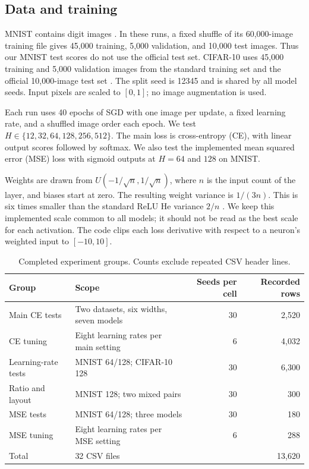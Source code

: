\documentclass[10pt]{article}
\begin{document}
\subsection{Data and training}
MNIST contains digit images \citep{lecun1998}. In these runs, a fixed shuffle of its 60,000-image training file gives 45,000 training, 5,000 validation, and 10,000 test images. Thus our MNIST test scores do not use the official test set. CIFAR-10 uses 45,000 training and 5,000 validation images from the standard training set and the official 10,000-image test set \citep{krizhevsky2009}. The split seed is 12345 and is shared by all model seeds. Input pixels are scaled to $[0,1]$; no image augmentation is used.

Each run uses 40 epochs of SGD with one image per update, a fixed learning rate, and a shuffled image order each epoch. We test $H\in\{12,32,64,128,256,512\}$. The main loss is cross-entropy (CE), with linear output scores followed by softmax. We also test the implemented mean squared error (MSE) loss with sigmoid outputs at $H=64$ and $128$ on MNIST.

Weights are drawn from $U(-1/\sqrt{n},1/\sqrt{n})$, where $n$ is the input count of the layer, and biases start at zero. The resulting weight variance is $1/(3n)$. This is six times smaller than the standard ReLU He variance $2/n$ \citep{he2015}. We keep this implemented scale common to all models; it should not be read as the best scale for each activation. The code clips each loss derivative with respect to a neuron's weighted input to $[-10,10]$.

\begin{table}[htbp]\centering
\caption{Completed experiment groups. Counts exclude repeated CSV header lines.}
\label{tab:inventory}\small
\begin{tabular}{@{}llrr@{}}\toprule
Group & Scope & Seeds per cell & Recorded rows\\\midrule
Main CE tests & Two datasets, six widths, seven models & 30 & 2,520\\
CE tuning & Eight learning rates per main setting & 6 & 4,032\\
Learning-rate tests & MNIST 64/128; CIFAR-10 128 & 30 & 6,300\\
Ratio and layout & MNIST 128; two mixed pairs & 30 & 300\\
MSE tests & MNIST 64/128; three models & 30 & 180\\
MSE tuning & Eight learning rates per MSE setting & 6 & 288\\\midrule
Total & 32 CSV files & & 13,620\\\bottomrule
\end{tabular}
\end{table}
\end{document}
